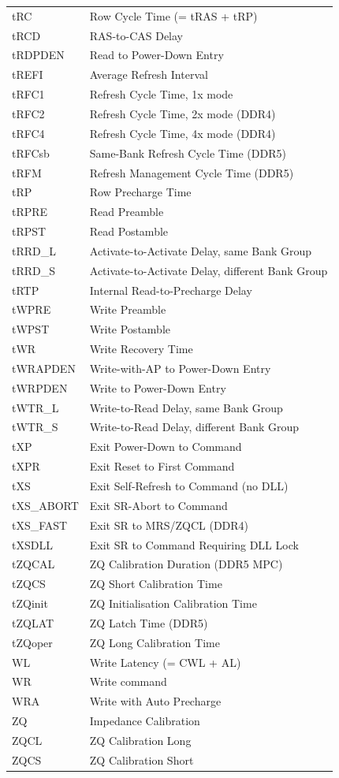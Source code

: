 \documentclass[11pt,a4paper]{article}
\begin{document}
\begin{longtable}{L{2.2cm} p{12cm}}
tRC      & Row Cycle Time (= tRAS + tRP) \\
tRCD     & RAS-to-CAS Delay \\
tRDPDEN  & Read to Power-Down Entry \\
tREFI    & Average Refresh Interval \\
tRFC1    & Refresh Cycle Time, 1x mode \\
tRFC2    & Refresh Cycle Time, 2x mode (DDR4) \\
tRFC4    & Refresh Cycle Time, 4x mode (DDR4) \\
tRFCsb   & Same-Bank Refresh Cycle Time (DDR5) \\
tRFM     & Refresh Management Cycle Time (DDR5) \\
tRP      & Row Precharge Time \\
tRPRE    & Read Preamble \\
tRPST    & Read Postamble \\
tRRD\_L  & Activate-to-Activate Delay, same Bank Group \\
tRRD\_S  & Activate-to-Activate Delay, different Bank Group \\
tRTP     & Internal Read-to-Precharge Delay \\
tWPRE    & Write Preamble \\
tWPST    & Write Postamble \\
tWR      & Write Recovery Time \\
tWRAPDEN & Write-with-AP to Power-Down Entry \\
tWRPDEN  & Write to Power-Down Entry \\
tWTR\_L  & Write-to-Read Delay, same Bank Group \\
tWTR\_S  & Write-to-Read Delay, different Bank Group \\
tXP      & Exit Power-Down to Command \\
tXPR     & Exit Reset to First Command \\
tXS      & Exit Self-Refresh to Command (no DLL) \\
tXS\_ABORT & Exit SR-Abort to Command \\
tXS\_FAST  & Exit SR to MRS/ZQCL (DDR4) \\
tXSDLL   & Exit SR to Command Requiring DLL Lock \\
tZQCAL   & ZQ Calibration Duration (DDR5 MPC) \\
tZQCS    & ZQ Short Calibration Time \\
tZQinit  & ZQ Initialisation Calibration Time \\
tZQLAT   & ZQ Latch Time (DDR5) \\
tZQoper  & ZQ Long Calibration Time \\
WL       & Write Latency (= CWL + AL) \\
WR       & Write command \\
WRA      & Write with Auto Precharge \\
ZQ       & Impedance Calibration \\
ZQCL     & ZQ Calibration Long \\
ZQCS     & ZQ Calibration Short \\
\end{longtable}
\end{document}
